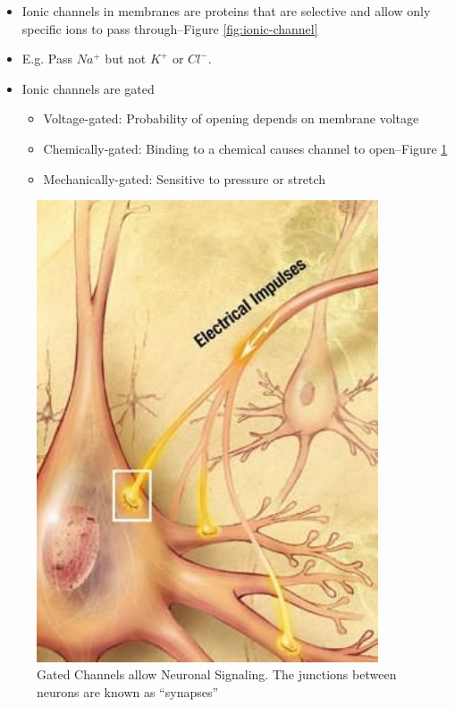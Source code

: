 \documentclass[]{article}
\begin{document}
\begin{itemize}
	\item Ionic channels in membranes are proteins that are selective and allow only specific ions to pass through--Figure \ref{fig:ionic-channel}
	\item E.g. Pass $Na^+$ but not $K^+$ or $Cl^-$.
	\item Ionic channels are gated
	\begin{itemize}
		\item 	Voltage-gated: Probability of opening depends on membrane voltage
		\item Chemically-gated: Binding to a chemical causes channel to open--Figure \ref{fig:signalling}
		\item Mechanically-gated: Sensitive to 	pressure or stretch
	\end{itemize}
\end{itemize}

\begin{figure}[H]
	\caption[Gated Channels allow Neuronal Signaling]{Gated Channels allow Neuronal Signaling. The junctions between neurons are known as ``synapses''}\label{fig:signalling}
	\includegraphics[width=0.9\textwidth]{signalling}
\end{figure}
\end{document}

